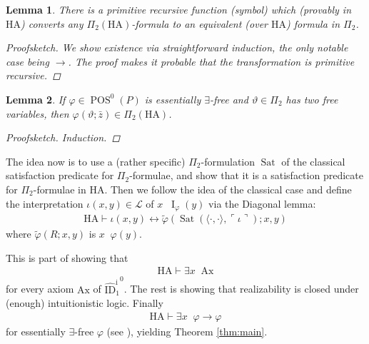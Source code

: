 \documentclass{scrartcl}
\theoremstyle{definition}
\theoremstyle{plain}
\newtheorem{Lma}{Lemma}
\theoremstyle{remark}
\newcommand{\limp}{\rightarrow}
\newcommand{\liff}{\leftrightarrow}
\renewcommand{\=}{=\!\!\!=}
\newcommand{\GN}[1]{\ensuremath{\ulcorner #1 \urcorner}}
\renewcommand{\L}{\ensuremath{\mathcal{L}}}
\DeclareMathOperator{\Sat}{Sat}
\DeclareMathOperator{\I}{I}
\DeclareMathOperator{\POS}{POS}
\newcommand{\IID}[1]{\ensuremath{\widehat{\mathrm{ID}}_{#1}^{\mathrm{i}}{}}}
\newcommand{\HA}{\ensuremath{\mathrm{HA}}}
\newcommand{\Ax}{\ensuremath{\mathrm{Ax}}}
\DeclareMathOperator{\rea}{\underbar{r}}
\begin{document}
\begin{Lma}
  There is a primitive recursive function (symbol) which (provably in $\HA$) converts any $\Pi_2(\HA)$-formula to an equivalent (over $\HA$) formula in $\Pi_2$.
  \begin{proof}[Proofsketch]
    We show existence via straightforward induction, the only notable case being $\limp$. The proof makes it probable that the transformation is primitive recursive.
  \end{proof}
\end{Lma}

\begin{Lma}
  If $\varphi \in \POS^0(P)$ is essentially $\exists$-free and $\vartheta \in \Pi_2$ has two free variables, then $\varphi(\vartheta;\bar{z}) \in \Pi_2(\HA)$.
  \begin{proof}[Proofsketch]
    Induction.
  \end{proof}
\end{Lma}

The idea now is to use a (rather specific) $\Pi_2$-formulation $\Sat$ of the classical satisfaction predicate for $\Pi_2$-formulae, and show that it is a satisfaction predicate for $\Pi_2$-formulae in $\HA$. Then we follow the idea of the classical case and define the interpretation $\iota(x,y) \in \L$ of $x \rea \I_{\varphi}(y)$ via the Diagonal lemma:
\begin{align*}
  \HA \vdash \iota(x,y) \liff \tilde{\varphi}(\Sat(\langle \cdot, \cdot \rangle,\GN{\iota});x,y)
\end{align*}
where $\tilde{\varphi}(R;x,y)$ is $x \rea \varphi(y)$.

This is part of showing that
\begin{align*}
  \HA \vdash \exists x \rea \Ax
\end{align*}
for every axiom $\Ax$ of $\IID1^0$. The rest is showing that realizability is closed under (enough) intuitionistic logic. Finally
\begin{align*}
  \HA \vdash \exists x \rea \varphi \limp \varphi
\end{align*}
for essentially $\exists$-free $\varphi$ (see \cite{Troelstra_vanDalen:1988}), yielding Theorem \ref{thm:main}.



\end{document}
